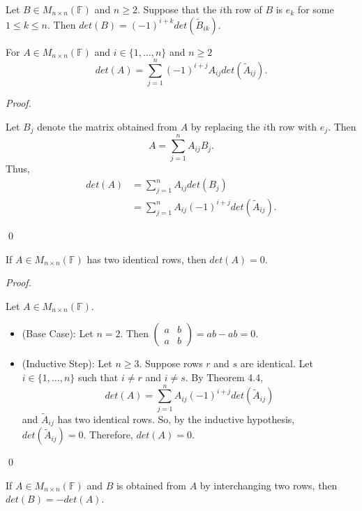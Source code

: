 \documentclass[12pt]{article}
\newenvironment{lemma}[2][Lemma]{\begin{trivlist}
\item[\hskip \labelsep {\bfseries #1}\hskip \labelsep {\bfseries #2.}]}{\end{trivlist}}
\newenvironment{theorem}[2][Theorem]{\begin{trivlist}
\item[\hskip \labelsep {\bfseries #1}\hskip \labelsep {\bfseries #2.}]}{\end{trivlist}}
\newenvironment{corollary}[2][Corollary]{\begin{trivlist}
\item[\hskip \labelsep {\bfseries #1}\hskip \labelsep {\bfseries #2}]}{\end{trivlist}}
\newenvironment{sol}
    {\emph{Proof.}
    }
    {
    \qed
    }
\begin{document}
\begin{lemma}{5}
Let $B \in M_{n \times n}(\mathbb{F})$ and $n \geq 2$. Suppose that the $i$th row of $B$ is $e_k$ for some $1 \leq k \leq n$. Then $det(B) = (-1)^{i + k}det(\tilde{B}_{ik})$.
\end{lemma}

\begin{theorem}{4.4}
For $A \in M_{n \times n}(\mathbb{F})$ and $i \in \{1, \dots, n\}$ and $n \geq 2$ $$det(A) = \sum_{j = 1}^n(-1)^{i + j}A_{ij}det(\tilde{A}_{ij}).$$
\end{theorem}

\begin{sol}
Let $B_j$ denote the matrix obtained from $A$ by replacing the $i$th row with $e_j$. Then $$A = \sum_{j = 1}^nA_{ij}B_j.$$ Thus, \begin{align*}
    det(A) &= \sum_{j = 1}^nA_{ij}det(B_j) \tag{By Theorem 4.3} \\
    &= \sum_{j = 1}^nA_{ij}(-1)^{i + j}det(\tilde{A}_{ij}). \tag{By Lemma 5}
\end{align*}
\end{sol}

\begin{corollary}{7}
If $A \in M_{n \times n}(\mathbb{F})$ has two identical rows, then $det(A) = 0$.
\end{corollary}

\begin{sol}
Let $A \in M_{n \times n}(\mathbb{F})$. \begin{itemize}
    \item[] (Base Case): Let $n = 2$. Then $\begin{pmatrix}
    a & b \\ a & b
    \end{pmatrix} = ab - ab = 0.$ 
    
    \item[] (Inductive Step): Let $n \geq 3$. Suppose rows $r$ and $s$ are identical. Let $i \in \{ 1, \dots, n \}$ such that $i \neq r$ and $i \neq s$. By Theorem 4.4, $$det(A) = \sum_{j = 1}^nA_{ij}(-1)^{i + j}det(\tilde{A}_{ij})$$ and $\tilde{A}_{ij}$ has two identical rows. So, by the inductive hypothesis, $det(\tilde{A}_{ij}) = 0$. Therefore, $det(A) = 0$.
\end{itemize}
\end{sol}

\begin{theorem}{4.5}
If $A \in M_{n \times n}(\mathbb{F})$ and $B$ is obtained from $A$ by interchanging two rows, then $det(B) = -det(A)$.
\end{theorem}
\end{document}
